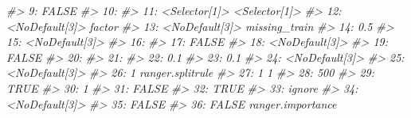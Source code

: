 \documentclass[
  11pt,
  ignorenonframetext,
  dvipsnames,UTF8]{beamer}
\newenvironment{Shaded}{\begin{snugshade}}{\end{snugshade}}
\newcommand{\CommentTok}[1]{\textcolor[rgb]{0.56,0.35,0.01}{\textit{#1}}}
\begin{document}
\begin{frame}[fragile]{}
\begin{Shaded}
\begin{Highlighting}[]
\CommentTok{\#\textgreater{}  9:            FALSE                                   }
\CommentTok{\#\textgreater{} 10:                                                    }
\CommentTok{\#\textgreater{} 11:    \textless{}Selector[1]\textgreater{}                      \textless{}Selector[1]\textgreater{}}
\CommentTok{\#\textgreater{} 12:   \textless{}NoDefault[3]\textgreater{}                             factor}
\CommentTok{\#\textgreater{} 13:   \textless{}NoDefault[3]\textgreater{}                      missing\_train}
\CommentTok{\#\textgreater{} 14:              0.5                                   }
\CommentTok{\#\textgreater{} 15:   \textless{}NoDefault[3]\textgreater{}                                   }
\CommentTok{\#\textgreater{} 16:                                                    }
\CommentTok{\#\textgreater{} 17:            FALSE                                   }
\CommentTok{\#\textgreater{} 18:   \textless{}NoDefault[3]\textgreater{}                                   }
\CommentTok{\#\textgreater{} 19:            FALSE                                   }
\CommentTok{\#\textgreater{} 20:                                                    }
\CommentTok{\#\textgreater{} 21:                                                    }
\CommentTok{\#\textgreater{} 22:              0.1                                   }
\CommentTok{\#\textgreater{} 23:              0.1                                   }
\CommentTok{\#\textgreater{} 24:   \textless{}NoDefault[3]\textgreater{}                                   }
\CommentTok{\#\textgreater{} 25:   \textless{}NoDefault[3]\textgreater{}                                   }
\CommentTok{\#\textgreater{} 26:                1  ranger.splitrule                 }
\CommentTok{\#\textgreater{} 27:                1                                  1}
\CommentTok{\#\textgreater{} 28:              500                                   }
\CommentTok{\#\textgreater{} 29:             TRUE                                   }
\CommentTok{\#\textgreater{} 30:                1                                   }
\CommentTok{\#\textgreater{} 31:            FALSE                                   }
\CommentTok{\#\textgreater{} 32:             TRUE                                   }
\CommentTok{\#\textgreater{} 33:           ignore                                   }
\CommentTok{\#\textgreater{} 34:   \textless{}NoDefault[3]\textgreater{}                                   }
\CommentTok{\#\textgreater{} 35:            FALSE                                   }
\CommentTok{\#\textgreater{} 36:            FALSE ranger.importance                 }

\end{Highlighting}
\end{Shaded}
\end{frame}
\end{document}
